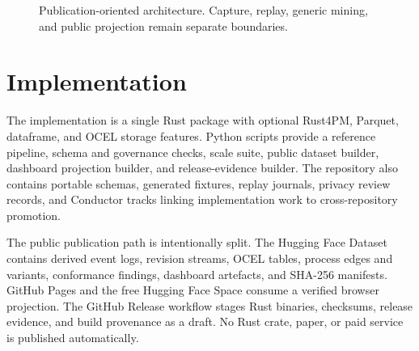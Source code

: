 \documentclass[11pt]{article}
\begin{document}
\begin{figure}[ht]
\centering
{}
\caption{Publication-oriented architecture. Capture, replay, generic mining, and public
projection remain separate boundaries.}
\label{fig:architecture}
\end{figure}

\section{Implementation}
The implementation is a single Rust package with optional Rust4PM, Parquet, dataframe, and OCEL
storage features. Python scripts provide a reference pipeline, schema and governance checks, scale
suite, public dataset builder, dashboard projection builder, and release-evidence builder. The
repository also contains portable schemas, generated fixtures, replay journals, privacy review
records, and Conductor tracks linking implementation work to cross-repository promotion.

The public publication path is intentionally split. The Hugging Face Dataset contains derived event
logs, revision streams, OCEL tables, process edges and variants, conformance findings, dashboard
artefacts, and SHA-256 manifests. GitHub Pages and the free Hugging Face Space consume a verified
browser projection. The GitHub Release workflow stages Rust binaries, checksums, release evidence,
and build provenance as a draft. No Rust crate, paper, or paid service is published automatically.
\end{document}
